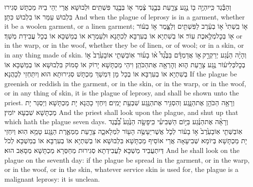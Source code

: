 {וְהַבֶּ֕גֶד כִּֽי\maqqaf יִהְיֶ֥ה ב֖וֹ נֶ֣גַע צָרָ֑עַת בְּבֶ֣גֶד צֶ֔מֶר א֖וֹ בְּבֶ֥גֶד פִּשְׁתִּֽים׃}
{וּלְבוּשָׁא אֲרֵי יְהֵי בֵיהּ מַכְתָּשׁ סְגִירוּ בִּלְבוּשׁ עַמַּר אוֹ בִלְבוּשׁ כִּתָּן׃}
{And when the plague of leprosy is in a garment, whether it be a woolen garment, or a linen garment;}{}
{א֤וֹ בִֽשְׁתִי֙ א֣וֹ בְעֵ֔רֶב לַפִּשְׁתִּ֖ים וְלַצָּ֑מֶר א֣וֹ בְע֔וֹר א֖וֹ בְּכׇל\maqqaf מְלֶ֥אכֶת עֽוֹר׃}
{אוֹ בְשִׁתְיָא אוֹ בְעִרְבָּא לְכִתָּנָא וּלְעַמְרָא אוֹ בְמַשְׁכָּא אוֹ בְכָל עֲבִידַת מְשַׁךְ׃}
{or in the warp, or in the woof, whether they be of linen, or of wool; or in a skin, or in any thing made of skin.}{}
{וְהָיָ֨ה הַנֶּ֜גַע יְרַקְרַ֣ק \legarmeh  א֣וֹ אֲדַמְדָּ֗ם בַּבֶּ֩גֶד֩ א֨וֹ בָע֜וֹר אֽוֹ\maqqaf בַשְּׁתִ֤י אוֹ\maqqaf בָעֵ֙רֶב֙ א֣וֹ בְכׇל\maqqaf כְּלִי\maqqaf ע֔וֹר נֶ֥גַע צָרַ֖עַת ה֑וּא וְהׇרְאָ֖ה אֶת\maqqaf הַכֹּהֵֽן׃}
{וִיהֵי מַכְתָּשָׁא יָרוֹק אוֹ סָמוֹק בִּלְבוּשָׁא אוֹ בְמַשְׁכָּא אוֹ בְשִׁתְיָא אוֹ בְעִרְבָּא אוֹ בְכָל מָן דִּמְשַׁךְ מַכְתָּשׁ סְגִירוּתָא הוּא וְיִתַּחְזֵי לְכָהֲנָא׃}
{If the plague be greenish or reddish in the garment, or in the skin, or in the warp, or in the woof, or in any thing of skin, it is the plague of leprosy, and shall be shown unto the priest.}{}
{וְרָאָ֥ה הַכֹּהֵ֖ן אֶת\maqqaf הַנָּ֑גַע וְהִסְגִּ֥יר אֶת\maqqaf הַנֶּ֖גַע שִׁבְעַ֥ת יָמִֽים׃}
{וְיִחְזֵי כָהֲנָא יָת מַכְתָּשָׁא וְיַסְגַּר יָת מַכְתָּשָׁא שִׁבְעָא יוֹמִין׃}
{And the priest shall look upon the plague, and shut up that which hath the plague seven days.}{}
{וְרָאָ֨ה אֶת\maqqaf הַנֶּ֜גַע בַּיּ֣וֹם הַשְּׁבִיעִ֗י כִּֽי\maqqaf פָשָׂ֤ה הַנֶּ֙גַע֙ בַּ֠בֶּ֠גֶד אֽוֹ\maqqaf בַשְּׁתִ֤י אֽוֹ\maqqaf בָעֵ֙רֶב֙ א֣וֹ בָע֔וֹר לְכֹ֛ל אֲשֶׁר\maqqaf יֵעָשֶׂ֥ה הָע֖וֹר לִמְלָאכָ֑ה צָרַ֧עַת מַמְאֶ֛רֶת הַנֶּ֖גַע טָמֵ֥א הֽוּא׃}
{וְיִחְזֵי יָת מַכְתָּשָׁא בְּיוֹמָא שְׁבִיעָאָה אֲרֵי אוֹסֵיף מַכְתָּשָׁא בִּלְבוּשָׁא אוֹ בְשִׁתְיָא אוֹ בְעִרְבָּא אוֹ בְמַשְׁכָּא לְכֹל דְּיִתְעֲבֵיד מַשְׁכָּא לַעֲבִידְתָא סְגִירוּת מְחַסְּרָא מַכְתָּשָׁא מְסָאַב הוּא׃}
{And he shall look on the plague on the seventh day: if the plague be spread in the garment, or in the warp, or in the woof, or in the skin, whatever service skin is used for, the plague is a malignant leprosy: it is unclean.}{}
